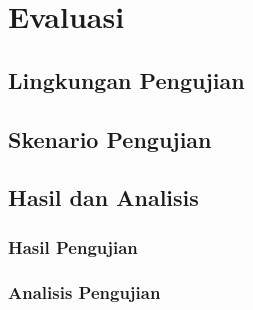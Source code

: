 
\section{Evaluasi}
\subsection{Lingkungan Pengujian}
\subsection{Skenario Pengujian}
\subsection{Hasil dan Analisis}
\subsubsection{Hasil Pengujian}
\subsubsection{Analisis Pengujian}

